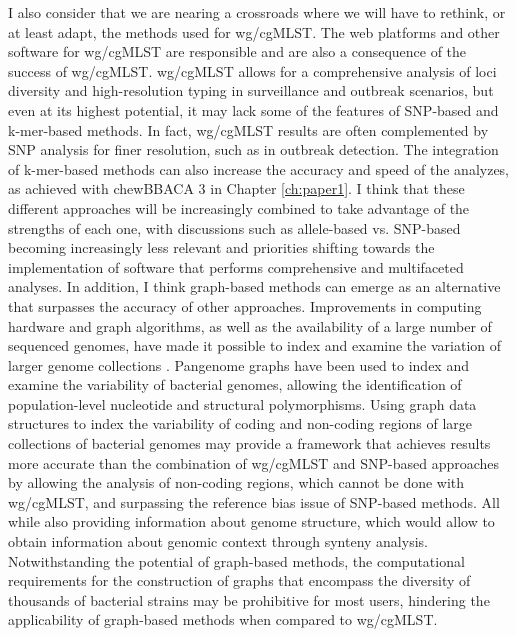 I also consider that we are nearing a crossroads where we will have to rethink, or at least adapt, the methods used for wg/cgMLST. The web platforms and other software for wg/cgMLST are responsible and are also a consequence of the success of wg/cgMLST. wg/cgMLST allows for a comprehensive analysis of loci diversity and high-resolution typing in surveillance and outbreak scenarios, but even at its highest potential, it may lack some of the features of SNP-based and k-mer-based methods. In fact, wg/cgMLST results are often complemented by SNP analysis for finer resolution, such as in outbreak detection. The integration of k-mer-based methods can also increase the accuracy and speed of the analyzes, as achieved with chewBBACA 3 in Chapter \ref{ch:paper1}. I think that these different approaches will be increasingly combined to take advantage of the strengths of each one, with discussions such as allele-based vs. SNP-based becoming increasingly less relevant and priorities shifting towards the implementation of software that performs comprehensive and multifaceted analyses. In addition, I think graph-based methods can emerge as an alternative that surpasses the accuracy of other approaches. Improvements in computing hardware and graph algorithms, as well as the availability of a large number of sequenced genomes, have made it possible to index and examine the variation of larger genome collections \cite{holley_bifrost_2020, harling-lee_graph-based_2022, noll_pangraph_2023}. Pangenome graphs have been used to index and examine the variability of bacterial genomes, allowing the identification of population-level nucleotide and structural polymorphisms. Using graph data structures to index the variability of coding and non-coding regions of large collections of bacterial genomes may provide a framework that achieves results more accurate than the combination of wg/cgMLST and SNP-based approaches by allowing the analysis of non-coding regions, which cannot be done with wg/cgMLST, and surpassing the reference bias issue of SNP-based methods. All while also providing information about genome structure, which would allow to obtain information about genomic context through synteny analysis. Notwithstanding the potential of graph-based methods, the computational requirements for the construction of graphs that encompass the diversity of thousands of bacterial strains may be prohibitive for most users, hindering the applicability of graph-based methods when compared to wg/cgMLST.

